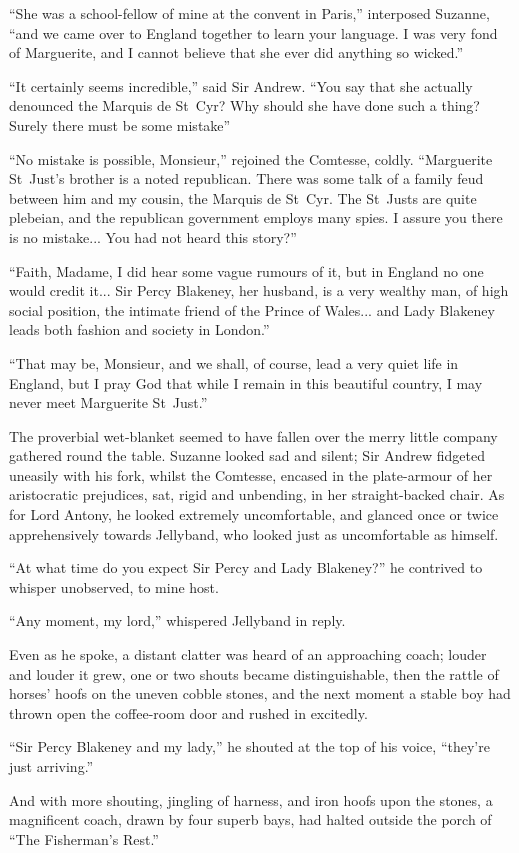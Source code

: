 \enquote{She was a school-fellow of mine at the convent in Paris,} interposed Suzanne, \enquote{and we came over to England together to learn your language. I was very fond of Marguerite, and I cannot believe that she ever did anything so wicked.}

\enquote{It certainly seems incredible,} said Sir Andrew. \enquote{You say that she actually denounced the Marquis de St~Cyr? Why should she have done such a thing? Surely there must be some mistake\longdash}

\enquote{No mistake is possible, Monsieur,} rejoined the Comtesse, coldly. \enquote{Marguerite St~Just's brother is a noted republican. There was some talk of a family feud between him and my cousin, the Marquis de St~Cyr. The St~Justs are quite plebeian, and the republican government employs many spies. I assure you there is no mistake... You had not heard this story?}

\enquote{Faith, Madame, I did hear some vague rumours of it, but in England no one would credit it... Sir Percy Blakeney, her husband, is a very wealthy man, of high social position, the intimate friend of the Prince of Wales... and Lady Blakeney leads both fashion and society in London.}

\enquote{That may be, Monsieur, and we shall, of course, lead a very quiet life in England, but I pray God that while I remain in this beautiful country, I may never meet Marguerite St~Just.}

The proverbial wet-blanket seemed to have fallen over the merry little company gathered round the table. Suzanne looked sad and silent; Sir Andrew fidgeted uneasily with his fork, whilst the Comtesse, encased in the plate-armour of her aristocratic prejudices, sat, rigid and unbending, in her straight-backed chair. As for Lord Antony, he looked extremely uncomfortable, and glanced once or twice apprehensively towards Jellyband, who looked just as uncomfortable as himself.

\enquote{At what time do you expect Sir Percy and Lady Blakeney?} he contrived to whisper unobserved, to mine host.

\enquote{Any moment, my lord,} whispered Jellyband in reply.

Even as he spoke, a distant clatter was heard of an approaching coach; louder and louder it grew, one or two shouts became distinguishable, then the rattle of horses’ hoofs on the uneven cobble stones, and the next moment a stable boy had thrown open the coffee-room door and rushed in excitedly.

\enquote{Sir Percy Blakeney and my lady,} he shouted at the top of his voice, \enquote{they're just arriving.}

And with more shouting, jingling of harness, and iron hoofs upon the stones, a magnificent coach, drawn by four superb bays, had halted outside the porch of \enquote{The Fisherman's Rest.}
